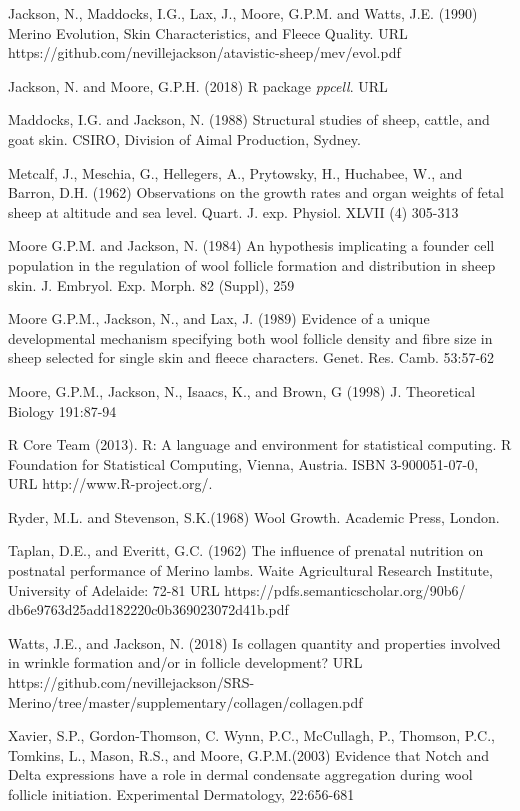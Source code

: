 \documentclass[titlepage]{article}  %
\begin{document}
\begin{thebibliography}{99}
Jackson, N., Maddocks, I.G., Lax, J., Moore, G.P.M. and Watts, J.E. (1990) Merino Evolution, Skin Characteristics, and Fleece Quality. URL https://github.com/nevillejackson/atavistic-sheep/mev/evol.pdf 

Jackson, N. and Moore, G.P.H. (2018) R package {\em ppcell}. URL

Maddocks, I.G. and Jackson, N. (1988) Structural studies of sheep, cattle, and goat skin. CSIRO, Division of Aimal Production, Sydney.

Metcalf, J., Meschia, G., Hellegers, A., Prytowsky, H., Huchabee, W., and Barron, D.H. (1962) Observations on the growth rates and organ weights of fetal sheep at altitude and sea level. Quart. J. exp. Physiol. XLVII (4) 305-313

Moore G.P.M. and Jackson, N. (1984) An hypothesis implicating a founder cell population in the regulation of wool follicle formation and distribution in sheep skin. J. Embryol. Exp. Morph. 82 (Suppl), 259

Moore G.P.M., Jackson, N., and Lax, J. (1989) Evidence of a unique developmental mechanism specifying both wool follicle density and fibre size in sheep selected for single skin and fleece characters. Genet. Res. Camb. 53:57-62

Moore, G.P.M., Jackson, N., Isaacs, K., and Brown, G (1998) J. Theoretical Biology 191:87-94

R Core Team (2013). R: A language and environment for statistical
  computing. R Foundation for Statistical Computing, Vienna, Austria.
  ISBN 3-900051-07-0, URL http://www.R-project.org/.

Ryder, M.L. and Stevenson, S.K.(1968) Wool Growth. Academic Press, London.

Taplan, D.E., and Everitt, G.C. (1962) The influence of prenatal nutrition on postnatal performance of Merino lambs. Waite Agricultural Research Institute, University of Adelaide: 72-81
URL https://pdfs.semanticscholar.org/90b6/
db6e9763d25add182220c0b369023072d41b.pdf

Watts, J.E., and Jackson, N. (2018) Is collagen quantity and properties involved in wrinkle formation and/or in follicle development? URL https://github.com/nevillejackson/SRS-Merino/tree/master/supplementary/collagen/collagen.pdf

Xavier, S.P., Gordon-Thomson, C. Wynn, P.C., McCullagh, P., Thomson, P.C., Tomkins, L., Mason, R.S., and Moore, G.P.M.(2003) Evidence that Notch and Delta expressions have a role in dermal condensate aggregation during wool follicle initiation. Experimental Dermatology, 22:656-681

\end{thebibliography}
\end{document}
